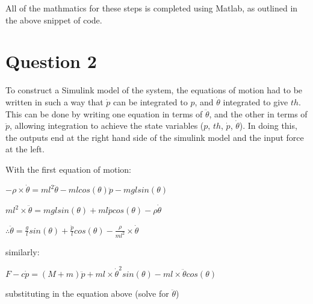 \documentclass[12pt]{article}
\begin{document}
\vspace{\baselineskip}


All of the mathmatics for these steps is completed using Matlab, as outlined in the above snippet of code.

\clearpage

\section{Question 2}

To construct a Simulink model of the system, the equations of motion had to be written in such a way that $\dot{p}$ can be integrated to $p$, and $\dot{\theta}$ integrated to give $th$. This can be done by writing one equation in terms of $\ddot{\theta}$, and the other in terms of $\ddot{p}$, allowing integration to achieve the state variables ($p$, $th$, $\dot{p}$, $\dot{\theta}$). In doing this, the outputs end at the right hand side of the simulink model and the input force at the left.

\vspace{\baselineskip}


With the first equation of motion:


\vspace{\baselineskip}


$ -\rho \times \dot{\theta} = m l^2 \ddot{\theta} - m l cos(\theta) \ddot{p} - m g l sin(\theta)$


\vspace{\baselineskip}


$m l^2 \times \ddot{\theta} = m g l sin(\theta) + m l \ddot{p} cos(\theta) - \rho \dot{\theta}$


\vspace{\baselineskip}


$\therefore \ddot{\theta} = \frac{g}{l} sin(\theta) + \frac{\ddot{p}}{l} cos(\theta) - \frac{\rho}{m l^2} \times \dot{\theta}$


\vspace{\baselineskip}


similarly:


\vspace{\baselineskip}



$F - c \dot{p} = (M+m) \ddot{p} + m l \times \dot{\theta}^2 sin(\theta) - m l \times \ddot{\theta} cos(\theta)$


\vspace{\baselineskip}


substituting in the equation above (solve for $\ddot{\theta}$)
\end{document}

